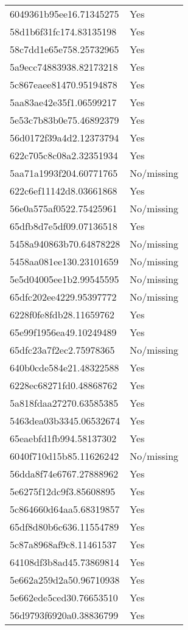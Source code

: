 \begin{tabular}{ll}
6049361b95ee16.71345275 & Yes \\
58d1b6f31fc174.83135198 & Yes \\
58c7dd1e65e758.25732965 & Yes \\
5a9ecc74883938.82173218 & Yes \\
5c867eaee81470.95194878 & Yes \\
5aa83ae42e35f1.06599217 & Yes \\
5e53c7b83b0e75.46892379 & Yes \\
56d0172f39a4d2.12373794 & Yes \\
622c705c8c08a2.32351934 & Yes \\
5aa71a1993f204.60771765 & No/missing \\
622c6ef11142d8.03661868 & Yes \\
56e0a575af0522.75425961 & No/missing \\
65dfb8d7e5df09.07136518 & Yes \\
5458a940863b70.64878228 & No/missing \\
5458aa081ee130.23101659 & No/missing \\
5e5d04005ee1b2.99545595 & No/missing \\
65dfc202ee4229.95397772 & No/missing \\
6228f0fe8fdb28.11659762 & Yes \\
65e99f1956ea49.10249489 & Yes \\
65dfc23a7f2ec2.75978365 & No/missing \\
640b0cde584e21.48322588 & Yes \\
6228ec68271fd0.48868762 & Yes \\
5a818fdaa27270.63585385 & Yes \\
5463dea03b3345.06532674 & Yes \\
65eaebfd1fb994.58137302 & Yes \\
6040f710d15b85.11626242 & No/missing \\
56dda8f74e6767.27888962 & Yes \\
5e6275f12dc9f3.85608895 & Yes \\
5c864660d64aa5.68319857 & Yes \\
65df8d80b6c636.11554789 & Yes \\
5c87a8968af9c8.11461537 & Yes \\
64108df3b8ad45.73869814 & Yes \\
5e662a259d2a50.96710938 & Yes \\
5e662ede5ced30.76653510 & Yes \\
56d9793f6920a0.38836799 & Yes \\

\end{tabular}
